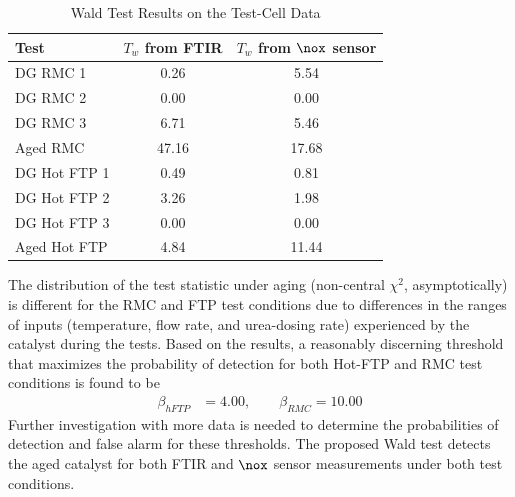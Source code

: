 \begin{table}[ht]
        \centering
        \caption{Wald Test Results on the Test-Cell Data}
        \label{tab::Tw_tst}
        \begin{tabular}{l c c}
        \hline \hline
        Test & $T_w$ from FTIR & $T_w$ from $\nox$ sensor \\\hline \hline
        DG RMC 1      & 0.26 & 5.54\\
        DG RMC 2      & 0.00 & 0.00\\
        DG RMC 3      & 6.71 & 5.46\\
        Aged RMC      & 47.16 & 17.68\\
        \hline
        DG Hot FTP 1  & 0.49 & 0.81\\
        DG Hot FTP 2  & 3.26 & 1.98\\
        DG Hot FTP 3  & 0.00 & 0.00\\
        Aged Hot FTP  & 4.84 & 11.44\\
        \hline \hline
        \end{tabular}
\end{table}
The distribution of the test statistic under aging (non-central $\chi^2$, asymptotically) is different for the RMC and FTP
test conditions due to differences in the ranges of inputs (temperature, flow rate, and urea-dosing rate) experienced
by the catalyst during the tests. Based on the results, a reasonably discerning threshold that maximizes the probability of detection for both Hot-FTP and RMC test conditions is found to be
\begin{align}
        \beta_{hFTP} &= 4.00, \qquad \beta_{RMC} = 10.00
\end{align}
Further investigation with more data is needed to determine the probabilities of detection and false alarm for these
thresholds. The proposed Wald test detects the aged catalyst for both FTIR and $\nox$ sensor measurements under both
test conditions.
